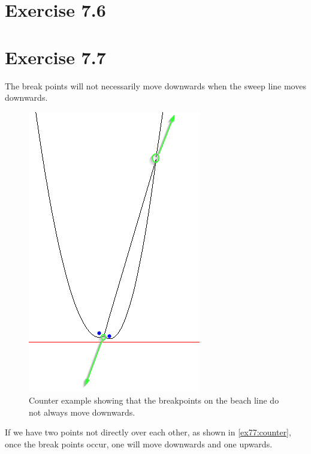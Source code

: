 \documentclass[11pt,a4paper]{article}
\begin{document}
\section{Exercise 7.6}


\section{Exercise 7.7}

The break points will not necessarily move downwards when the sweep line moves
downwards.

\begin{figure}[h!]
    \centering
    \includegraphics{ex77-counter}
    \caption{Counter example showing that the breakpoints on the beach line do not always move downwards.}
    \label{ex77:counter}
\end{figure}

If we have two points not directly over each other, as shown in \autoref{ex77:counter}, once the break points
occur, one will move downwards and one upwards.
\end{document}
